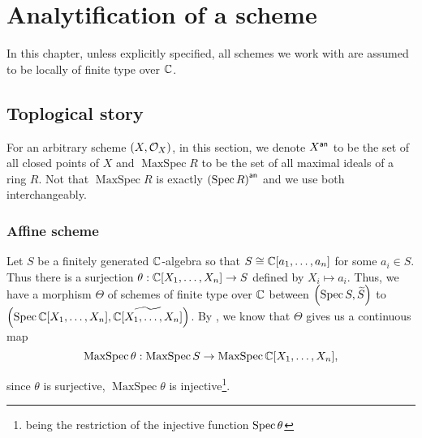 
\chapter{Analytification of a scheme}

In this chapter, unless explicitly specified, all schemes we work with are assumed to be locally of finite type over $\mathbb{C}$.

\section{Toplogical story}


For an arbitrary scheme $\left(X, \mathcal{O}_{X}\right)$, in this section, we denote ${X}^{\mathsf{an}}$ to be the set of all closed points of $X$ and $\operatorname{MaxSpec} R$ to be the set of all maximal ideals of a ring $R$. Not that $\operatorname{MaxSpec} R$ is exactly ${\left(\operatorname{Spec}{R}\right)}^{\mathsf{an}}$ and we use both interchangeably.

\subsection{Affine scheme}



Let $S$ be a finitely generated $\mathbb{C}$-algebra so that $S \cong \mathbb{C}[a_{1},\dots, a_{n}]$ for some $a_{i} \in S$. Thus there is a surjection $\theta: \mathbb{C}[X_{1}, \dots, X_{n}] \to S$ defined by $X_{i} \mapsto a_{i}$. Thus, we have a morphism $\Theta$ of schemes of finite type over $\mathbb{C}$ between $\left(\operatorname*{Spec}{S}, \widetilde{S}\right)$ to $\left(\operatorname*{Spec}{\mathbb{C}[X_{1},\dots, X_{n}]}, \widetilde{\mathbb{C}[X_{1},\dots, X_{n}]}\right)$. By , we know that $\Theta$ gives us a continuous map
\[
\operatorname{MaxSpec}\theta: \operatorname{MaxSpec} S \to \operatorname{MaxSpec} \mathbb{C}[X_{1},\dots, X_{n}],
\]

since $\theta$ is surjective, $\operatorname{MaxSpec}\theta$ is injective\footnote{being the restriction of the injective function $\operatorname{Spec} \theta$}.

